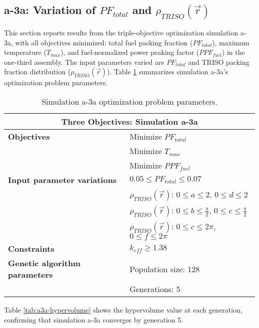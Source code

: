 \subsection{a-3a: Variation of $PF_{total}$ and $\rho_{TRISO}(\vec{r})$}
\label{sec:a-3a}
This section reports results from the triple-objective optimization simulation a-3a, 
with all objectives minimized: total fuel packing fraction ($PF_{total}$), 
maximum temperature ($T_{max}$), and fuel-normalized power peaking factor ($PPF_{fuel}$)
in the one-third assembly.  
The input parameters varied are $PF_{total}$ and TRISO packing fraction distribution 
($\rho_{TRISO}(\vec{r})$). 
Table \ref{tab:simulationa3a} summarizes simulation a-3a's optimization problem parameters. 
\begin{table}[htbp!]
    \centering
    \onehalfspacing
    \caption{Simulation a-3a optimization problem parameters.}
	\label{tab:simulationa3a}
    \footnotesize
    \begin{tabular}{l|p{5.3cm}}
    \hline 
    \multicolumn{2}{c}{\textbf{Three Objectives: Simulation a-3a}} \\
    \hline 
    \textbf{Objectives} & Minimize $PF_{total}$ \\
    & Minimize $T_{max}$ \\
    & Minimize $PPF_{fuel}$ \\
    \hline 
    \textbf{Input parameter variations} & $0.05 \leq PF_{total} \leq 0.07$ \\
    & $\rho_{TRISO}(\vec{r})$: $0 \leq a \leq 2$, $0 \leq d \leq 2$\\
    & $\rho_{TRISO}(\vec{r})$: $0 \leq b \leq \frac{\pi}{2}$, $0 \leq e \leq \frac{\pi}{2}$\\
    & $\rho_{TRISO}(\vec{r})$: $0 \leq c \leq 2\pi$, $0 \leq f \leq 2\pi$\\
    \hline
    \textbf{Constraints} & $k_{eff} \geq 1.38$\\ 
    \hline 
    \textbf{Genetic algorithm parameters} & Population size: 128 \\
    & Generations: 5 \\
    \hline
    \end{tabular}
\end{table}
Table \ref{tab:a3a-hypervolume} shows the hypervolume value at each generation, 
confirming that simulation a-3a converges by generation 5. 
